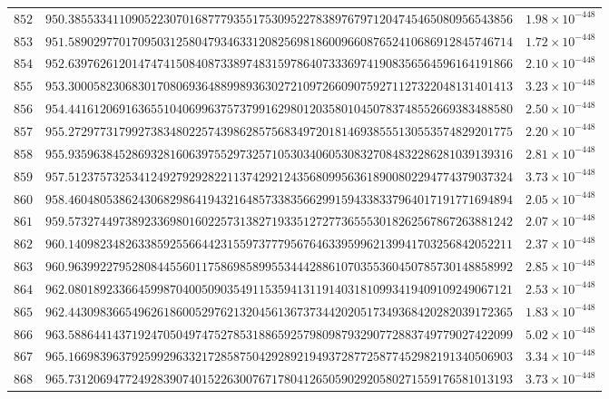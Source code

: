 \documentclass[12pt,reqno]{amsart}
\theoremstyle{remark}
\begin{document}
\begin{longtable}{clc}
$852$ & $950.3855334110905223070168777935517530952278389767971204745465080956543856$ & $1.98\times 10^{-448}$ \\
$853$ & $951.5890297701709503125804793463312082569818600966087652410686912845746714$ & $1.72\times 10^{-448}$ \\
$854$ & $952.6397626120147474150840873389748315978640733369741908356564596164191866$ & $2.10\times 10^{-448}$ \\
$855$ & $953.3000582306830170806936488998936302721097266090759271127322048131401413$ & $3.23\times 10^{-448}$ \\
$856$ & $954.4416120691636551040699637573799162980120358010450783748552669383488580$ & $2.50\times 10^{-448}$ \\
$857$ & $955.2729773179927383480225743986285756834972018146938555130553574829201775$ & $2.20\times 10^{-448}$ \\
$858$ & $955.9359638452869328160639755297325710530340605308327084832286281039139316$ & $2.81\times 10^{-448}$ \\
$859$ & $957.5123757325341249279292822113742921243568099563618900802294774379037324$ & $3.73\times 10^{-448}$ \\
$860$ & $958.4604805386243068298641943216485733835662991594338337964017191771694894$ & $2.05\times 10^{-448}$ \\
$861$ & $959.5732744973892336980160225731382719335127277365553018262567867263881242$ & $2.07\times 10^{-448}$ \\
$862$ & $960.1409823482633859255664423155973777956764633959962139941703256842052211$ & $2.37\times 10^{-448}$ \\
$863$ & $960.9639922795280844556011758698589955344428861070355360450785730148858992$ & $2.85\times 10^{-448}$ \\
$864$ & $962.0801892336645998704005090354911535941311914031810993419409109249067121$ & $2.53\times 10^{-448}$ \\
$865$ & $962.4430983665496261860052976213204561367373442020517349368420282039172365$ & $1.83\times 10^{-448}$ \\
$866$ & $963.5886441437192470504974752785318865925798098793290772883749779027422099$ & $5.02\times 10^{-448}$ \\
$867$ & $965.1669839637925992963321728587504292892194937287725877452982191340506903$ & $3.34\times 10^{-448}$ \\
$868$ & $965.7312069477249283907401522630076717804126505902920580271559176581013193$ & $3.73\times 10^{-448}$ \\

\end{longtable}
\end{document}
